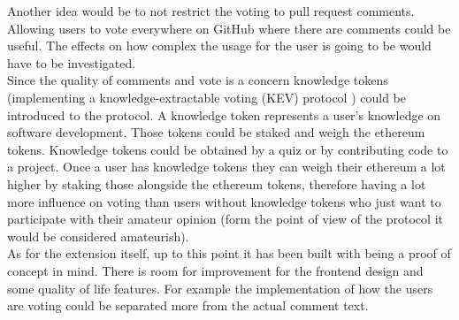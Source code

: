 \documentclass[sigconf]{acmart}
\begin{document}
Another idea would be to not restrict the voting to pull request comments. Allowing users to vote everywhere on GitHub where there are comments could be useful. The effects on how complex the usage for the user is going to be would have to be investigated.\\

Since the quality of comments and vote is a concern knowledge tokens (implementing a knowledge-extractable voting (KEV) protocol \cite{medium2}) could be introduced to the protocol. A knowledge token represents a user's knowledge on software development.
Those tokens could be staked and weigh the ethereum tokens.
Knowledge tokens could be obtained by a quiz or by contributing code to a project.
Once a user has knowledge tokens they can weigh their ethereum a lot higher by staking those alongside the ethereum tokens, therefore having a lot more influence on voting than users without knowledge tokens who just want to participate with their amateur opinion (form the point of view of the protocol it would be considered amateurish).\\

As for the extension itself, up to this point it has been built with being a proof of concept in mind. There is room for improvement for the frontend design and some quality of life features.
For example the implementation of how the users are voting could be separated more from the actual comment text.\\ 




\end{document}
